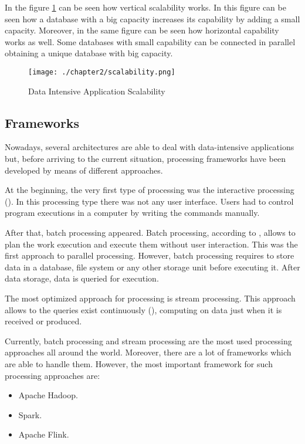 In the figure \ref{fig:Data Intensive Application Scalability} can be seen how vertical scalability works. In this figure can be seen how a database with a big capacity increases its capability by adding a small capacity. Moreover, in the same figure can be seen how horizontal capability works as well. Some databases with small capability can be connected in parallel obtaining a unique database with big capacity.

\begin{figure}
\centering
{\texttt{[image: ./chapter2/scalability.png]}}
\caption{Data Intensive Application Scalability}
\label{fig:Data Intensive Application Scalability}
\end{figure}

\subsection{Frameworks}

Nowadays, several architectures are able to deal with data-intensive applications but, before arriving to the current situation, processing frameworks have been developed by means of different approaches.

At the beginning, the very first type of processing was the interactive processing (\cite{interactiveprocessing}). In this processing type there was not any user interface. Users had to control program executions in a computer by writing the commands manually.

After that, batch processing appeared. Batch processing, according to \cite{interactiveprocessing}, allows to plan the work execution and execute them without user interaction. This was the first approach to parallel processing. However, batch processing requires to store data in a database, file system or any other storage unit before executing it. After data storage, data is queried for execution.

The most optimized approach for processing is stream processing. This approach allows to the queries exist continuously (\cite{streamprocessing}), computing on data just when it is received or produced.

Currently, batch processing and stream processing are the most used processing approaches all around the world. Moreover, there are a lot of frameworks which are able to handle them. However, the most important framework for such processing approaches are:

\begin{itemize}
\item Apache Hadoop.
\item Spark.
\item Apache Flink.
\end{itemize}


